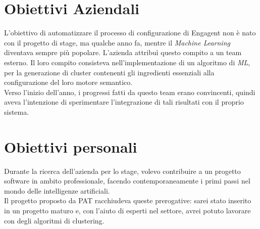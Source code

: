 \section{Obiettivi Aziendali}
L'obiettivo di automatizzare il processo di configurazione di Engagent non è nato con il progetto di stage, ma qualche anno fa, mentre il \textit{Machine Learning} diventava sempre più popolare. L'azienda attribuì questo compito a un team esterno. Il loro compito consisteva nell'implementazione di un algoritmo di \textit{ML}, per la generazione di cluster contenenti gli ingredienti essenziali alla configurazione del loro motore semantico.\\
Verso l'inizio dell'anno, i progressi fatti da questo team erano convincenti, quindi \company{} aveva l'intenzione di sperimentare l'integrazione di tali risultati con il proprio sistema.

\section{Obiettivi personali}

Durante la ricerca dell'azienda per lo stage, volevo contribuire a un progetto software in ambito professionale, facendo contemporaneamente i primi passi nel mondo delle intelligenze artificiali.\\
Il progetto proposto da PAT racchiudeva queste prerogative: sarei stato inserito in un progetto maturo e, con l'aiuto di esperti nel settore, avrei potuto lavorare con degli algoritmi di clustering.   

